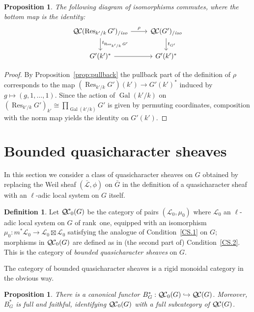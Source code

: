 \documentclass[11pt]{amsart}
\theoremstyle{plain}
\newtheorem{proposition}[theorem]{Proposition}
\theoremstyle{definition}
\newtheorem{definition}[theorem]{Definition}
\theoremstyle{remark}
\newcommand{\EE}{\mathbb{\bar Q}_\ell}
\DeclareMathOperator{\Gal}{Gal}
\DeclareMathOperator{\Res}{Res}
\newcommand{\sheafHom}{{\mathscr{H}\hskip-4pt{\it o}\hskip-2pt{\it m}}}
\newcommand{\ceq}{{\, :=\, }}
\newcommand{\qcs}[1]{{\mathcal{#1}}}
\newcommand{\gqcs}[1]{{\mathcal{\bar #1}}}
\newcommand{\QC}{{\mathcal{Q\hskip-0.8pt C}}}
\newcommand{\QCb}{{\QC_0}}
\newcommand{\QCiso}[1]{\QC(#1)_{/\textit{iso}}}
\newcommand{\trFrob}[1]{t_{#1}}
\newcommand{\bG}{\bar{G}}
\begin{document}
\begin{proposition}
The following diagram of isomorphisms commutes, where the bottom map is the identity:
\[
\begin{tikzcd}
\QCiso{\Res_{k'/k} G'} \dar{\trFrob{\Res_{k'/k} G'}} \rar{\rho} & \QCiso{G'} \dar{\trFrob{G'}}\\
G'(k')^* \rar & G'(k')^*
\end{tikzcd}
\]
\end{proposition}
\begin{proof}
By Proposition~\ref{prop:pullback} the pullback part of the definition of $\rho$ corresponds to the map $(\Res_{k'/k}G')(k') \to G'(k')^*$
induced by $g \mapsto (g, 1, \ldots, 1)$.  Since the action of $\Gal(k'/k)$ on $(\Res_{k'/k}G')_{k'} \cong \prod_{\Gal(k'/k)} G'$
is given by permuting coordinates, composition with the norm map yields the identity on $G'(k')$.
\end{proof}

\section{Bounded quasicharacter sheaves}\label{sec:bounded}

In this section we consider a class of quasicharacter sheaves on $G$ obtained by
replacing the Weil sheaf $(\gqcs{L}, \phi)$ on $\bG$ in the definition of a quasicharacter
sheaf with an $\ell$-adic local system on $G$ itself.

\begin{definition}
Let $\QCb(G)$ be the category of pairs $(\qcs{L}_0,\mu_0)$ 
where $\qcs{L}_0$ an $\ell$-adic local system on $G$ of rank~one, 
equipped with an isomorphism $\mu_0 : m^* \qcs{L}_0 \to \qcs{L}_0 \boxtimes \qcs{L}_0$ 
satisfying the analogue of Condition~\ref{CS.1} on $G$; 
morphisms in $\QCb(G)$ are defined as in (the second part of) Condition~\ref{CS.2}. 
This is the category of \emph{bounded quasicharacter sheaves} on $G$. 
\end{definition}

The category of bounded quasicharacter sheaves is a rigid monoidal category in the obvious way. 

\begin{proposition}
There is a canonical functor $B_G^* : \QCb(G) \hookrightarrow \QC(G)$. Moreover, $B_G^*$
is full and faithful, identifying $\QCb(G)$ with a full subcategory of $\QC(G)$.
\end{proposition}
\end{document}
